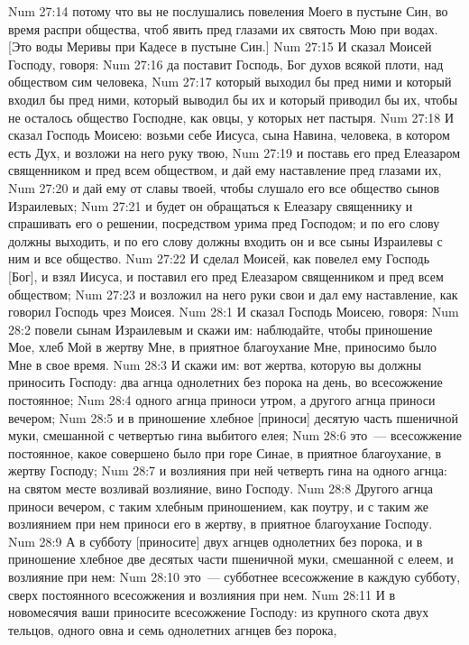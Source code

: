 \vs Num 27:14 потому что вы не послушались повеления Моего в пустыне Син, во время распри общества, чтоб явить пред глазами их святость Мою при водах. [Это воды Меривы при Кадесе в пустыне Син.]
\vs Num 27:15 И сказал Моисей Господу, говоря:
\vs Num 27:16 да поставит Господь, Бог духов всякой плоти, над обществом сим человека,
\vs Num 27:17 который выходил бы пред ними и который входил бы пред ними, который выводил бы их и который приводил бы их, чтобы не осталось общество Господне, как овцы, у которых нет пастыря.
\vs Num 27:18 И сказал Господь Моисею: возьми себе Иисуса, сына Навина, человека, в котором есть Дух, и возложи на него руку твою,
\vs Num 27:19 и поставь его пред Елеазаром священником и пред всем обществом, и дай ему наставление пред глазами их,
\vs Num 27:20 и дай ему от славы твоей, чтобы слушало его все общество сынов Израилевых;
\vs Num 27:21 и будет он обращаться к Елеазару священнику и спрашивать его о решении, посредством урима пред Господом; и по его слову должны выходить, и по его слову должны входить он и все сыны Израилевы с ним и все общество.
\vs Num 27:22 И сделал Моисей, как повелел ему Господь [Бог], и взял Иисуса, и поставил его пред Елеазаром священником и пред всем обществом;
\vs Num 27:23 и возложил на него руки свои и дал ему наставление, как говорил Господь чрез Моисея.
\vs Num 28:1 И сказал Господь Моисею, говоря:
\vs Num 28:2 повели сынам Израилевым и скажи им: наблюдайте, чтобы приношение Мое, хлеб Мой в жертву Мне, в приятное благоухание Мне, приносимо было Мне в свое время.
\vs Num 28:3 И скажи им: вот жертва, которую вы должны приносить Господу: два агнца однолетних без порока на день, во всесожжение постоянное;
\vs Num 28:4 одного агнца приноси утром, а другого агнца приноси вечером;
\vs Num 28:5 и в приношение хлебное [приноси] десятую часть  пшеничной муки, смешанной с четвертью гина выбитого елея;
\vs Num 28:6 это~--- всесожжение постоянное, какое совершено было при горе Синае, в приятное благоухание, в жертву Господу;
\vs Num 28:7 и возлияния при ней четверть гина на одного агнца: на святом месте возливай возлияние, вино Господу.
\vs Num 28:8 Другого агнца приноси вечером, с таким хлебным приношением, как поутру, и с таким же возлиянием при нем приноси его в жертву, в приятное благоухание Господу.
\vs Num 28:9 А в субботу [приносите] двух агнцев однолетних без порока, и в приношение хлебное две десятых части  пшеничной муки, смешанной с елеем, и возлияние при нем:
\vs Num 28:10 это~--- субботнее всесожжение в каждую субботу, сверх постоянного всесожжения и возлияния при нем.
\vs Num 28:11 И в новомесячия ваши приносите всесожжение Господу: из крупного скота двух тельцов, одного овна и семь однолетних агнцев без порока,
